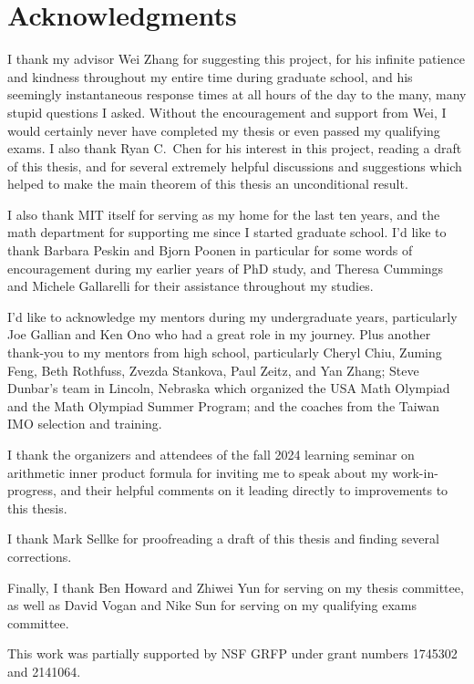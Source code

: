

\chapter*{Acknowledgments}

I thank my advisor Wei Zhang for suggesting this project,
for his infinite patience and kindness throughout my entire time during graduate school,
and his seemingly instantaneous response times at all hours of the day
to the many, many stupid questions I asked.
Without the encouragement and support from Wei,
I would certainly never have completed my thesis or even passed my qualifying exams.
I also thank Ryan C.~Chen for his interest in this project,
reading a draft of this thesis, and for several extremely helpful discussions and suggestions
which helped to make the main theorem of this thesis an unconditional result.

I also thank MIT itself for serving as my home for the last ten years,
and the math department for supporting me since I started graduate school.
I'd like to thank Barbara Peskin and Bjorn Poonen in particular
for some words of encouragement during my earlier years of PhD study,
and Theresa Cummings and Michele Gallarelli for their assistance throughout my studies.

I'd like to acknowledge my mentors during my undergraduate years,
particularly Joe Gallian and Ken Ono who had a great role in my journey.
Plus another thank-you to my mentors from high school, particularly
Cheryl Chiu, Zuming Feng, Beth Rothfuss, Zvezda Stankova, Paul Zeitz, and Yan Zhang;
Steve Dunbar's team in Lincoln, Nebraska which organized the USA Math Olympiad
and the Math Olympiad Summer Program;
and the coaches from the Taiwan IMO selection and training.

I thank the organizers and attendees of the fall 2024
learning seminar on arithmetic inner product formula
for inviting me to speak about my work-in-progress, and their helpful comments on it
leading directly to improvements to this thesis.

I thank Mark Sellke for proofreading a draft of this thesis
and finding several corrections.

Finally, I thank Ben Howard and Zhiwei Yun for serving on my thesis committee,
as well as David Vogan and Nike Sun for serving on my qualifying exams committee.

This work was partially supported by NSF GRFP under grant numbers 1745302 and 2141064.
